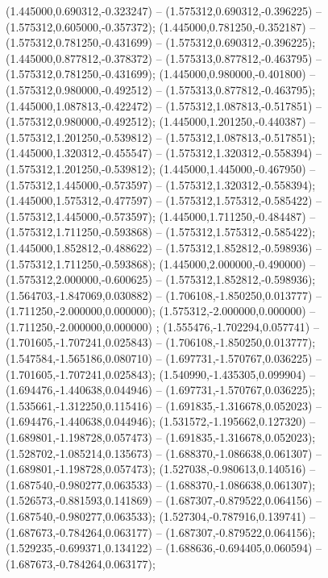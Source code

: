  (1.445000,0.690312,-0.323247) -- (1.575312,0.690312,-0.396225) -- (1.575312,0.605000,-0.357372);
 (1.445000,0.781250,-0.352187) -- (1.575312,0.781250,-0.431699) -- (1.575312,0.690312,-0.396225);
 (1.445000,0.877812,-0.378372) -- (1.575313,0.877812,-0.463795) -- (1.575312,0.781250,-0.431699);
 (1.445000,0.980000,-0.401800) -- (1.575312,0.980000,-0.492512) -- (1.575313,0.877812,-0.463795);
 (1.445000,1.087813,-0.422472) -- (1.575312,1.087813,-0.517851) -- (1.575312,0.980000,-0.492512);
 (1.445000,1.201250,-0.440387) -- (1.575312,1.201250,-0.539812) -- (1.575312,1.087813,-0.517851);
 (1.445000,1.320312,-0.455547) -- (1.575312,1.320312,-0.558394) -- (1.575312,1.201250,-0.539812);
 (1.445000,1.445000,-0.467950) -- (1.575312,1.445000,-0.573597) -- (1.575312,1.320312,-0.558394);
 (1.445000,1.575312,-0.477597) -- (1.575312,1.575312,-0.585422) -- (1.575312,1.445000,-0.573597);
 (1.445000,1.711250,-0.484487) -- (1.575312,1.711250,-0.593868) -- (1.575312,1.575312,-0.585422);
 (1.445000,1.852812,-0.488622) -- (1.575312,1.852812,-0.598936) -- (1.575312,1.711250,-0.593868);
 (1.445000,2.000000,-0.490000) -- (1.575312,2.000000,-0.600625) -- (1.575312,1.852812,-0.598936);
 (1.564703,-1.847069,0.030882) -- (1.706108,-1.850250,0.013777) -- (1.711250,-2.000000,0.000000);
 (1.575312,-2.000000,0.000000) -- (1.711250,-2.000000,0.000000) ;
 (1.555476,-1.702294,0.057741) -- (1.701605,-1.707241,0.025843) -- (1.706108,-1.850250,0.013777);
 (1.547584,-1.565186,0.080710) -- (1.697731,-1.570767,0.036225) -- (1.701605,-1.707241,0.025843);
 (1.540990,-1.435305,0.099904) -- (1.694476,-1.440638,0.044946) -- (1.697731,-1.570767,0.036225);
 (1.535661,-1.312250,0.115416) -- (1.691835,-1.316678,0.052023) -- (1.694476,-1.440638,0.044946);
 (1.531572,-1.195662,0.127320) -- (1.689801,-1.198728,0.057473) -- (1.691835,-1.316678,0.052023);
 (1.528702,-1.085214,0.135673) -- (1.688370,-1.086638,0.061307) -- (1.689801,-1.198728,0.057473);
 (1.527038,-0.980613,0.140516) -- (1.687540,-0.980277,0.063533) -- (1.688370,-1.086638,0.061307);
 (1.526573,-0.881593,0.141869) -- (1.687307,-0.879522,0.064156) -- (1.687540,-0.980277,0.063533);
 (1.527304,-0.787916,0.139741) -- (1.687673,-0.784264,0.063177) -- (1.687307,-0.879522,0.064156);
 (1.529235,-0.699371,0.134122) -- (1.688636,-0.694405,0.060594) -- (1.687673,-0.784264,0.063177);
